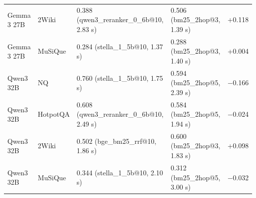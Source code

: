 \begin{table}[t]
\begin{tabular*}{\linewidth}{@{\extracolsep{\fill}}llllr}
Gemma 3 27B & 2Wiki & 0.388 (qwen3\_reranker\_0\_6b@10, 2.83 s) & 0.506 (bm25\_2hop@3, 1.39 s) & +0.118 \\
Gemma 3 27B & MuSiQue & 0.284 (stella\_1\_5b@10, 1.37 s) & 0.288 (bm25\_2hop@3, 1.40 s) & +0.004 \\
Qwen3 32B & NQ & 0.760 (stella\_1\_5b@10, 1.75 s) & 0.594 (bm25\_2hop@5, 2.39 s) & $-$0.166 \\
Qwen3 32B & HotpotQA & 0.608 (qwen3\_reranker\_0\_6b@10, 2.49 s) & 0.584 (bm25\_2hop@5, 1.94 s) & $-$0.024 \\
Qwen3 32B & 2Wiki & 0.502 (bge\_bm25\_rrf@10, 1.86 s) & 0.600 (bm25\_2hop@3, 1.83 s) & +0.098 \\
Qwen3 32B & MuSiQue & 0.344 (stella\_1\_5b@10, 2.10 s) & 0.312 (bm25\_2hop@5, 3.00 s) & $-$0.032 \\
\bottomrule
\end{tabular*}
\end{table}
